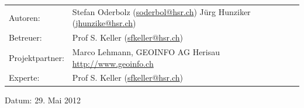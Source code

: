 \begin{titlepage}
\begin{flushleft}
\begin{tabular}{lp{10cm}}
Autoren: & Stefan Oderbolz (\url{soderbol@hsr.ch}) \newline
 Jürg Hunziker (\url{jhunzike@hsr.ch}) \\ 
Betreuer: & Prof S. Keller (\url{sfkeller@hsr.ch}) \\ 
Projektpartner: & Marco Lehmann, GEOINFO AG Herisau \url{http://www.geoinfo.ch} \\ 
Experte: & Prof S. Keller (\url{sfkeller@hsr.ch}) \\ 
\end{tabular}

\vfill
Datum: {29. Mai 2012}

\end{flushleft}
\end{titlepage}
